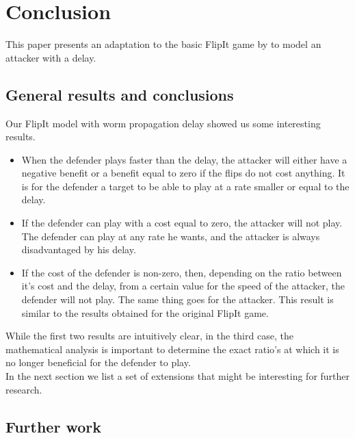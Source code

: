 \chapter{Conclusion}
\label{chapter5:conclusion}

This paper presents an adaptation to the basic FlipIt game by \citep{FlipIt} to model an attacker with a delay.  

\section{General results and conclusions}
Our FlipIt model with worm propagation delay showed us some interesting results. 
\begin{itemize}
\item When the defender plays faster than the delay, the attacker will either have a negative benefit or a benefit equal to zero if the flips do not cost anything. It is for the defender a target to be able to play at a rate smaller or equal to the delay.
\item If the defender can play with a cost equal to zero, the attacker will not play. The defender can play at any rate he wants, and the attacker is always disadvantaged by his delay.
\item If the cost of the defender is non-zero, then, depending on the ratio between it's cost and the delay, from a certain value for the speed of the attacker, the defender will not play. The same thing goes for the attacker. This result is similar to the results obtained for the original FlipIt game.
\end{itemize}

While the first two results are intuitively clear, in the third case, the mathematical analysis is important to determine the exact ratio's at which it is no longer beneficial for the defender to play. \\
In the next section we list a set of extensions that might be interesting for further research.
\section{Further work}


